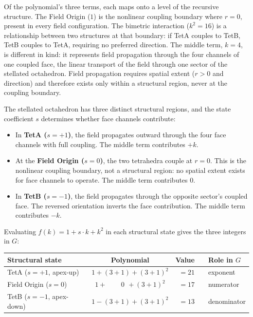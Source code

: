 \documentclass[aps,prd,preprint,superscriptaddress,showpacs,preprintnumbers,amsmath,amssymb,nofootinbib]{revtex4-2}
\begin{document}
Of the polynomial's three terms, each maps onto a level of the recursive structure. The Field Origin ($1$) is the nonlinear coupling boundary where $r = 0$, present in every field configuration. The bimetric interaction ($k^2 = 16$) is a relationship between two structures at that boundary: if TetA couples to TetB, TetB couples to TetA, requiring no preferred direction. The middle term, $k = 4$, is different in kind: it represents field propagation through the four channels of one coupled face, the linear transport of the field through one sector of the stellated octahedron. Field propagation requires spatial extent ($r > 0$ and direction) and therefore exists only within a structural region, never at the coupling boundary.

The stellated octahedron has three distinct structural regions, and the state coefficient $s$ determines whether face channels contribute:

\begin{itemize}
\item In \textbf{TetA ($s = +1$)}, the field propagates outward through the four face channels with full coupling. The middle term contributes $+k$.
\item At the \textbf{Field Origin ($s = 0$)}, the two tetrahedra couple at $r = 0$. This is the nonlinear coupling boundary, not a structural region: no spatial extent exists for face channels to operate. The middle term contributes $0$.
\item In \textbf{TetB ($s = -1$)}, the field propagates through the opposite sector's coupled face. The reversed orientation inverts the face contribution. The middle term contributes $-k$.
\end{itemize}

Evaluating $f(k) = 1 + s \cdot k + k^2$ in each structural state gives the three integers in $G$:

\begin{center}
\renewcommand{\arraystretch}{1.4}
\begin{tabular*}{\textwidth}{@{\extracolsep{\fill}} lcrcl}
\hline
\textbf{Structural state} & \textbf{Polynomial} & \textbf{Value} & & \textbf{Role in $G$} \\
\hline
TetA ($s = +1$, apex-up) & $1 + (3{+}1) + (3{+}1)^2$ & $= 21$ & & exponent \\
Field Origin ($s = 0$) & $1 + \phantom{(3{+}}0\phantom{)} + (3{+}1)^2$ & $= 17$ & & numerator \\
TetB ($s = -1$, apex-down) & $1 - (3{+}1) + (3{+}1)^2$ & $= 13$ & & denominator \\
\hline
\end{tabular*}
\end{center}
\end{document}
